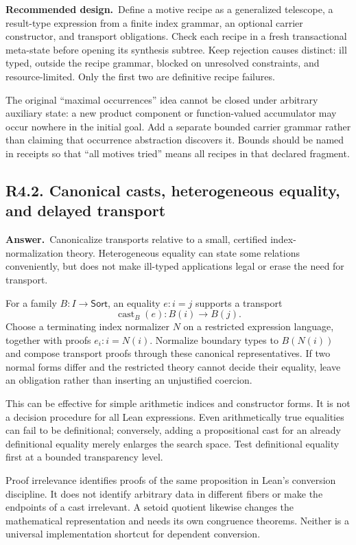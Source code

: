 \documentclass[11pt,a4paper]{article}
\newcommand{\qid}[3]{\subsection{#2. #3}\label{#1}}
\newcommand{\answer}{\noindent\textbf{Answer.}\ }
\newcommand{\proposal}{\noindent\textbf{Recommended design.}\ }
\theoremstyle{remark}
\begin{document}
\proposal Define a motive recipe as a generalized telescope, a result-type expression from a finite index grammar, an optional carrier constructor, and transport obligations. Check each recipe in a fresh transactional meta-state before opening its synthesis subtree. Keep rejection causes distinct: ill typed, outside the recipe grammar, blocked on unresolved constraints, and resource-limited. Only the first two are definitive recipe failures.

The original ``maximal occurrences'' idea cannot be closed under arbitrary auxiliary state: a new product component or function-valued accumulator may occur nowhere in the initial goal. Add a separate bounded carrier grammar rather than claiming that occurrence abstraction discovers it. Bounds should be named in receipts so that ``all motives tried'' means all recipes in that declared fragment.

\qid{q42}{R4.2}{Canonical casts, heterogeneous equality, and delayed transport}
\answer Canonicalize transports relative to a small, certified index-normalization theory. Heterogeneous equality can state some relations conveniently, but does not make ill-typed applications legal or erase the need for transport.

For a family $B:I\to\mathsf{Sort}$, an equality $e:i=j$ supports a transport
\[
 \operatorname{cast}_B(e):B(i)\to B(j).
\]
Choose a terminating index normalizer $N$ on a restricted expression language, together with proofs $e_i:i=N(i)$. Normalize boundary types to $B(N(i))$ and compose transport proofs through these canonical representatives. If two normal forms differ and the restricted theory cannot decide their equality, leave an obligation rather than inserting an unjustified coercion.

This can be effective for simple arithmetic indices and constructor forms. It is not a decision procedure for all Lean expressions. Even arithmetically true equalities can fail to be definitional; conversely, adding a propositional cast for an already definitional equality merely enlarges the search space. Test definitional equality first at a bounded transparency level.

Proof irrelevance identifies proofs of the same proposition in Lean's conversion discipline. It does not identify arbitrary data in different fibers or make the endpoints of a cast irrelevant. A setoid quotient likewise changes the mathematical representation and needs its own congruence theorems. Neither is a universal implementation shortcut for dependent conversion.
\end{document}
